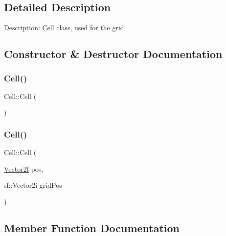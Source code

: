 \subsection{Detailed Description}
Description\+: \mbox{\hyperlink{class_cell}{Cell}} class, used for the grid 

\subsection{Constructor \& Destructor Documentation}
\mbox{\label{class_cell_a394510643e8664cf12b5efaf5cb99f71}} 
\subsubsection{\texorpdfstring{Cell()}{Cell()}\hspace{0.1cm}{\footnotesize\ttfamily [1/2]}}
{\footnotesize\ttfamily Cell\+::\+Cell (\begin{DoxyParamCaption}{ }\end{DoxyParamCaption})\hspace{0.3cm}{\ttfamily [inline]}}

\mbox{\label{class_cell_a593b00540f83a9e43da779ca17e9a3f5}} 
\subsubsection{\texorpdfstring{Cell()}{Cell()}\hspace{0.1cm}{\footnotesize\ttfamily [2/2]}}
{\footnotesize\ttfamily Cell\+::\+Cell (\begin{DoxyParamCaption}\item[{\mbox{\hyperlink{class_vector2f}{Vector2f}}}]{pos,  }\item[{sf\+::\+Vector2i}]{grid\+Pos }\end{DoxyParamCaption})\hspace{0.3cm}{\ttfamily [inline]}}



\subsection{Member Function Documentation}
\mbox{\label{class_cell_a7a6b856714dcd60e3f819217c74c7b30}} 
